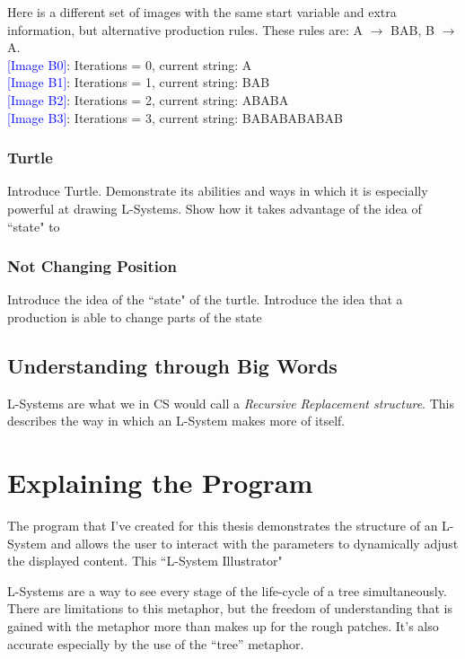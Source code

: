 \documentclass[12pt,twoside]{reedthesis}
\begin{document}
Here is a different set of images with the same start variable and extra information, but alternative production rules. These rules are: A $\rightarrow$ BAB, B $\rightarrow$ A.
\\\textcolor{blue}{[Image B0]}: Iterations = 0, current string: A
\\\textcolor{blue}{[Image B1]}: Iterations = 1, current string: BAB
\\\textcolor{blue}{[Image B2]}: Iterations = 2, current string: ABABA
\\\textcolor{blue}{[Image B3]}: Iterations = 3, current string: BABABABABAB

\subsection{Turtle}
Introduce Turtle. Demonstrate its abilities and ways in which it is especially powerful at drawing L-Systems. Show how it takes advantage of the idea of ``state" to 
\subsection{Not Changing Position}
Introduce the idea of the ``state" of the turtle. Introduce the idea that a production is able to change parts of the state 


\section{Understanding through Big Words}

L-Systems are what we in CS would call a \textit{Recursive Replacement structure}. This describes the way in which an L-System makes more of itself. 





\chapter{Explaining the Program}

The program that I've created for this thesis demonstrates the structure of an L-System and allows the user to interact with the parameters to dynamically adjust the displayed content. This ``L-System Illustrator" 


L-Systems are a way to see every stage of the life-cycle of a tree simultaneously. There are limitations to this metaphor, but the freedom of understanding that is gained with the metaphor more than makes up for the rough patches. It’s also accurate especially by the use of the “tree” metaphor. 
\end{document}
